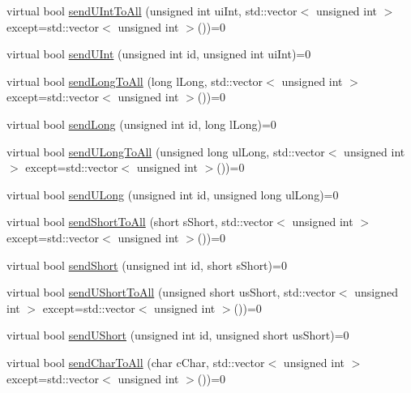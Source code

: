 \begin{DoxyCompactItemize}
virtual bool \hyperlink{class_rad_jav_1_1_networking_1_1_tcpip_server_a2b0079d2576307f6d9d97ff1071803b4}{send\+U\+Int\+To\+All} (unsigned int ui\+Int, std\+::vector$<$ unsigned int $>$ except=std\+::vector$<$ unsigned int $>$())=0
\item 
virtual bool \hyperlink{class_rad_jav_1_1_networking_1_1_tcpip_server_a95efbee2717a0041529d946e64f37f84}{send\+U\+Int} (unsigned int id, unsigned int ui\+Int)=0
\item 
virtual bool \hyperlink{class_rad_jav_1_1_networking_1_1_tcpip_server_ad665a325e62d7e2d26a07df9a4252908}{send\+Long\+To\+All} (long l\+Long, std\+::vector$<$ unsigned int $>$ except=std\+::vector$<$ unsigned int $>$())=0
\item 
virtual bool \hyperlink{class_rad_jav_1_1_networking_1_1_tcpip_server_a5682292316a739d06c3d47beacc57c21}{send\+Long} (unsigned int id, long l\+Long)=0
\item 
virtual bool \hyperlink{class_rad_jav_1_1_networking_1_1_tcpip_server_aca1ad9e798867b2ad30549596a5b7797}{send\+U\+Long\+To\+All} (unsigned long ul\+Long, std\+::vector$<$ unsigned int $>$ except=std\+::vector$<$ unsigned int $>$())=0
\item 
virtual bool \hyperlink{class_rad_jav_1_1_networking_1_1_tcpip_server_a7569ab1c9539152858de532f690c93b6}{send\+U\+Long} (unsigned int id, unsigned long ul\+Long)=0
\item 
virtual bool \hyperlink{class_rad_jav_1_1_networking_1_1_tcpip_server_a0f4293aa1327842c755779440fafb960}{send\+Short\+To\+All} (short s\+Short, std\+::vector$<$ unsigned int $>$ except=std\+::vector$<$ unsigned int $>$())=0
\item 
virtual bool \hyperlink{class_rad_jav_1_1_networking_1_1_tcpip_server_a9973b5b52ce05f7d4f8f8596fa0471ce}{send\+Short} (unsigned int id, short s\+Short)=0
\item 
virtual bool \hyperlink{class_rad_jav_1_1_networking_1_1_tcpip_server_ad2a7ce5b92e68fe8b34b0722aeb3701c}{send\+U\+Short\+To\+All} (unsigned short us\+Short, std\+::vector$<$ unsigned int $>$ except=std\+::vector$<$ unsigned int $>$())=0
\item 
virtual bool \hyperlink{class_rad_jav_1_1_networking_1_1_tcpip_server_ac17ee8eda47602dd45024f68cd80c67c}{send\+U\+Short} (unsigned int id, unsigned short us\+Short)=0
\item 
virtual bool \hyperlink{class_rad_jav_1_1_networking_1_1_tcpip_server_a7d48a8247da4a2c98fdc90a88c0c4775}{send\+Char\+To\+All} (char c\+Char, std\+::vector$<$ unsigned int $>$ except=std\+::vector$<$ unsigned int $>$())=0

\end{DoxyCompactItemize}
